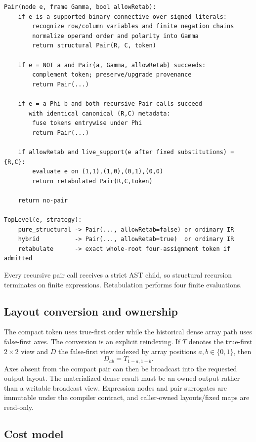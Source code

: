 \documentclass[10pt]{article}
\theoremstyle{plain}
\theoremstyle{definition}
\theoremstyle{remark}
\begin{document}
\begin{lstlisting}
Pair(node e, frame Gamma, bool allowRetab):
    if e is a supported binary connective over signed literals:
        recognize row/column variables and finite negation chains
        normalize operand order and polarity into Gamma
        return structural Pair(R, C, token)

    if e = NOT a and Pair(a, Gamma, allowRetab) succeeds:
        complement token; preserve/upgrade provenance
        return Pair(...)

    if e = a Phi b and both recursive Pair calls succeed
       with identical canonical (R,C) metadata:
        fuse tokens entrywise under Phi
        return Pair(...)

    if allowRetab and live_support(e after fixed substitutions) = {R,C}:
        evaluate e on (1,1),(1,0),(0,1),(0,0)
        return retabulated Pair(R,C,token)

    return no-pair

TopLevel(e, strategy):
    pure_structural -> Pair(..., allowRetab=false) or ordinary IR
    hybrid          -> Pair(..., allowRetab=true)  or ordinary IR
    retabulate      -> exact whole-root four-assignment token if admitted
\end{lstlisting}

Every recursive pair call receives a strict AST child, so structural recursion terminates on finite expressions. Retabulation performs four finite evaluations.

\subsection{Layout conversion and ownership}

The compact token uses true-first order while the historical dense array path uses false-first axes. The conversion is an explicit reindexing. If $T$ denotes the true-first $2\times2$ view and $D$ the false-first view indexed by array positions $a,b\in\{0,1\}$, then
\begin{equation}
 D_{ab}=T_{1-a,1-b}.
 \label{eq:layout-conversion}
\end{equation}
Axes absent from the compact pair can then be broadcast into the requested output layout. The materialized dense result must be an owned output rather than a writable broadcast view. Expression nodes and pair surrogates are immutable under the compiler contract, and caller-owned layouts/fixed maps are read-only.

\subsection{Cost model}
\end{document}

